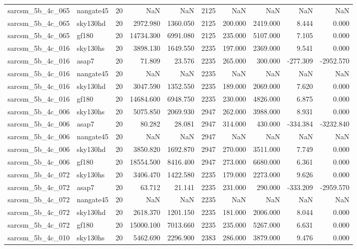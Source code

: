 \begin{tabular}{llrrrrrrrr}
sarcsm\_5b\_4c\_065 & nangate45 & 20 & NaN & NaN & 2125 & NaN & NaN & NaN & NaN \\
sarcsm\_5b\_4c\_065 & sky130hd & 20 & 2972.980 & 1360.050 & 2125 & 200.000 & 2419.000 & 8.444 & 0.000 \\
sarcsm\_5b\_4c\_065 & gf180 & 20 & 14734.300 & 6991.080 & 2125 & 235.000 & 5107.000 & 7.105 & 0.000 \\
sarcsm\_5b\_4c\_016 & sky130hs & 20 & 3898.130 & 1649.550 & 2235 & 197.000 & 2369.000 & 9.541 & 0.000 \\
sarcsm\_5b\_4c\_016 & asap7 & 20 & 71.809 & 23.576 & 2235 & 265.000 & 300.000 & -277.309 & -2952.570 \\
sarcsm\_5b\_4c\_016 & nangate45 & 20 & NaN & NaN & 2235 & NaN & NaN & NaN & NaN \\
sarcsm\_5b\_4c\_016 & sky130hd & 20 & 3047.590 & 1352.550 & 2235 & 189.000 & 2069.000 & 7.620 & 0.000 \\
sarcsm\_5b\_4c\_016 & gf180 & 20 & 14684.600 & 6948.750 & 2235 & 230.000 & 4826.000 & 6.875 & 0.000 \\
sarcsm\_5b\_4c\_006 & sky130hs & 20 & 5075.850 & 2069.930 & 2947 & 262.000 & 3988.000 & 8.931 & 0.000 \\
sarcsm\_5b\_4c\_006 & asap7 & 20 & 80.282 & 28.081 & 2947 & 314.000 & 430.000 & -334.384 & -3232.840 \\
sarcsm\_5b\_4c\_006 & nangate45 & 20 & NaN & NaN & 2947 & NaN & NaN & NaN & NaN \\
sarcsm\_5b\_4c\_006 & sky130hd & 20 & 3850.820 & 1692.870 & 2947 & 270.000 & 3511.000 & 7.749 & 0.000 \\
sarcsm\_5b\_4c\_006 & gf180 & 20 & 18554.500 & 8416.400 & 2947 & 273.000 & 6680.000 & 6.361 & 0.000 \\
sarcsm\_5b\_4c\_072 & sky130hs & 20 & 3406.470 & 1422.580 & 2235 & 179.000 & 2273.000 & 9.626 & 0.000 \\
sarcsm\_5b\_4c\_072 & asap7 & 20 & 63.712 & 21.141 & 2235 & 231.000 & 290.000 & -333.209 & -2959.570 \\
sarcsm\_5b\_4c\_072 & nangate45 & 20 & NaN & NaN & 2235 & NaN & NaN & NaN & NaN \\
sarcsm\_5b\_4c\_072 & sky130hd & 20 & 2618.370 & 1201.150 & 2235 & 181.000 & 2006.000 & 8.044 & 0.000 \\
sarcsm\_5b\_4c\_072 & gf180 & 20 & 15000.100 & 7013.660 & 2235 & 235.000 & 5267.000 & 6.631 & 0.000 \\
sarcsm\_5b\_4c\_010 & sky130hs & 20 & 5462.690 & 2296.900 & 2383 & 286.000 & 3879.000 & 9.476 & 0.000 \\

\end{tabular}

